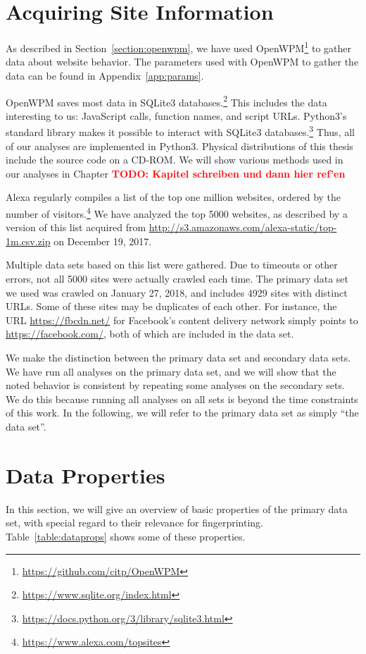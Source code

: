 \documentclass[
    fontsize=12pt,
    headings=small,
    parskip=half,
    bibliography=totoc,
    numbers=noenddot,
    open=any
    ]{scrreprt}
\newcommand{\todo}[1]{\textcolor{red}{\textbf{TODO: #1}}}
\begin{document}
\section{Acquiring Site Information}
As described in Section~\ref{section:openwpm}, we have used OpenWPM\footnote{\url{https://github.com/citp/OpenWPM}} to gather data about
website behavior.
The parameters used with OpenWPM to gather the data can be found in Appendix~\ref{app:params}.

OpenWPM saves most data in SQLite3 databases.\footnote{\url{https://www.sqlite.org/index.html}}
This includes the data interesting to us: JavaScript calls, function names, and script URLs.
Python3's standard library makes it possible to interact with SQLite3
databases.\footnote{\url{https://docs.python.org/3/library/sqlite3.html}}
Thus, all of our analyses are implemented in Python3.
Physical distributions of this thesis include the source code on a CD-ROM.
We will show various methods used in our analyses in Chapter \todo{Kapitel schreiben und dann hier ref'en}

Alexa regularly compiles a list of the top one million websites, ordered by the number of
visitors.\footnote{\url{https://www.alexa.com/topsites}}
We have analyzed the top 5000 websites, as described by a version of this list acquired from
\url{http://s3.amazonaws.com/alexa-static/top-1m.csv.zip} on December 19, 2017.

Multiple data sets based on this list were gathered. Due to timeouts or other
errors, not all 5000 sites were actually crawled each time.
The primary data set we used was crawled on January 27, 2018, and includes 4929 sites with distinct URLs. Some of these sites
may be duplicates of each other. For instance, the URL \url{https://fbcdn.net/} for Facebook's content delivery
network simply points to \url{https://facebook.com/}, both of which are included in the data set.

We make the distinction between the primary data set and secondary data sets.
We have run all analyses on the primary data set, and we will show
that the noted behavior is consistent by repeating some analyses
on the secondary sets.
We do this because running all analyses on all sets is beyond the time
constraints of this work.
In the following, we will refer to the primary data set as simply ``the data set''.

\section{Data Properties}
\label{section:data_properties}
In this section, we will give an overview of basic properties of the primary data set,
with special regard to their relevance for fingerprinting.
Table~\ref{table:dataprops} shows some of these properties.
\end{document}
